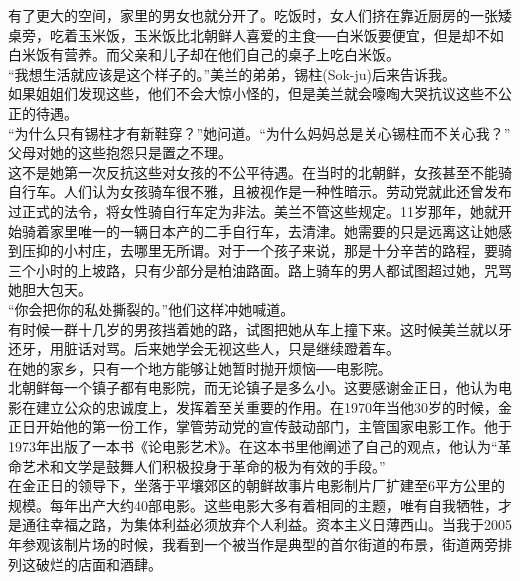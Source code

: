 有了更大的空间，家里的男女也就分开了。吃饭时，女人们挤在靠近厨房的一张矮桌旁，吃着玉米饭，玉米饭比北朝鲜人喜爱的主食──白米饭要便宜，但是却不如白米饭有营养。而父亲和儿子却在他们自己的桌子上吃白米饭。\\

“我想生活就应该是这个样子的。”美兰的弟弟，锡柱(Sok-ju)后来告诉我。\\

如果姐姐们发现这些，他们不会大惊小怪的，但是美兰就会嚎啕大哭抗议这些不公正的待遇。\\

“为什么只有锡柱才有新鞋穿？”她问道。“为什么妈妈总是关心锡柱而不关心我？”\\

父母对她的这些抱怨只是置之不理。\\

这不是她第一次反抗这些对女孩的不公平待遇。在当时的北朝鲜，女孩甚至不能骑自行车。人们认为女孩骑车很不雅，且被视作是一种性暗示。劳动党就此还曾发布过正式的法令，将女性骑自行车定为非法。美兰不管这些规定。11岁那年，她就开始骑着家里唯一的一辆日本产的二手自行车，去清津。她需要的只是远离这让她感到压抑的小村庄，去哪里无所谓。对于一个孩子来说，那是十分辛苦的路程，要骑三个小时的上坡路，只有少部分是柏油路面。路上骑车的男人都试图超过她，咒骂她胆大包天。\\

“你会把你的私处撕裂的。”他们这样冲她喊道。\\

有时候一群十几岁的男孩挡着她的路，试图把她从车上撞下来。这时候美兰就以牙还牙，用脏话对骂。后来她学会无视这些人，只是继续蹬着车。\\

在她的家乡，只有一个地方能够让她暂时抛开烦恼──电影院。\\

北朝鲜每一个镇子都有电影院，而无论镇子是多么小。这要感谢金正日，他认为电影在建立公众的忠诚度上，发挥着至关重要的作用。在1970年当他30岁的时候，金正日开始他的第一份工作，掌管劳动党的宣传鼓动部门，主管国家电影工作。他于1973年出版了一本书《论电影艺术》。在这本书里他阐述了自己的观点，他认为“革命艺术和文学是鼓舞人们积极投身于革命的极为有效的手段。”\\

在金正日的领导下，坐落于平壤郊区的朝鲜故事片电影制片厂扩建至6平方公里的规模。每年出产大约40部电影。这些电影大多有着相同的主题，唯有自我牺牲，才是通往幸福之路，为集体利益必须放弃个人利益。资本主义日薄西山。当我于2005年参观该制片场的时候，我看到一个被当作是典型的首尔街道的布景，街道两旁排列这破烂的店面和酒肆。\\

